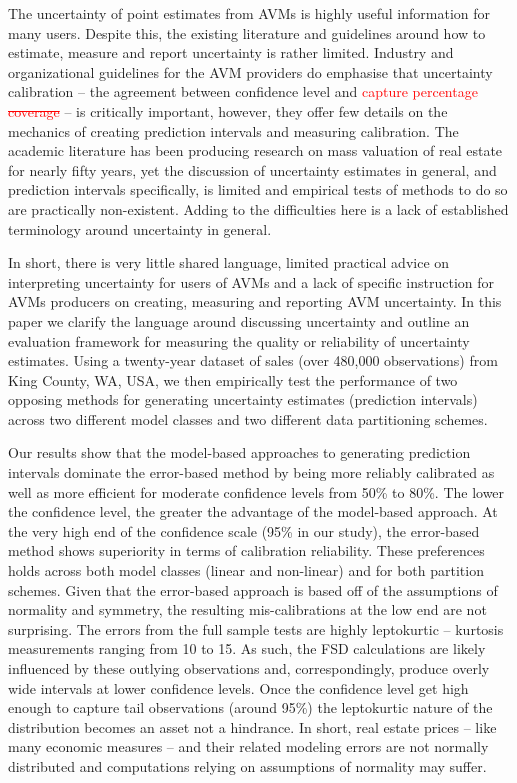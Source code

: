 \documentclass[colTwo]{anon}
\theoremstyle{definition}
\begin{document}
The uncertainty of point estimates from AVMs is highly useful information for many users. Despite this, the existing literature and guidelines around how to estimate, measure and report uncertainty is rather limited.  Industry and organizational guidelines for the AVM providers do emphasise that uncertainty calibration -- the agreement between confidence level and \textcolor{red}{capture percentage \st{coverage}} -- is critically important, however, they offer few details on the mechanics of creating prediction intervals and measuring calibration. The academic literature has been producing research on mass valuation of real estate for nearly fifty years, yet the discussion of uncertainty estimates in general, and prediction intervals specifically, is limited and empirical tests of methods to do so are practically non-existent.  Adding to the difficulties here is a lack of established terminology around uncertainty in general.  

In short, there is very little shared language, limited practical advice on interpreting uncertainty for users of AVMs  and a lack of specific instruction for AVMs producers on creating, measuring and reporting AVM uncertainty. In this paper we clarify the language around discussing uncertainty and outline an evaluation framework for measuring the quality or reliability of uncertainty estimates.  Using a twenty-year dataset of sales (over 480,000 observations) from King County, WA, USA, we then empirically test the performance of two opposing methods for generating uncertainty estimates (prediction intervals) across two different model classes and two different data partitioning schemes.

Our results show that the model-based approaches to generating prediction intervals dominate the error-based method by being more reliably calibrated as well as more efficient for moderate confidence levels from 50\% to 80\%.  The lower the confidence level, the greater the advantage of the model-based approach. At the very high end of the confidence scale (95\% in our study), the error-based method shows superiority in terms of calibration reliability. These preferences holds across both model classes (linear and non-linear) and for both partition schemes.  Given that the error-based approach is based off of the assumptions of normality and symmetry, the resulting mis-calibrations at the low end are not surprising.  The errors from the full sample tests are highly leptokurtic -- kurtosis measurements ranging from 10 to 15. As such, the FSD calculations are likely influenced by these outlying observations and, correspondingly, produce overly wide intervals at lower confidence levels. Once the confidence level get high enough to capture tail observations (around 95\%) the leptokurtic nature of the distribution becomes an asset not a hindrance.  In short, real estate prices -- like many economic measures -- and their related modeling errors are not normally distributed and computations relying on assumptions of normality may suffer. 
\end{document}
